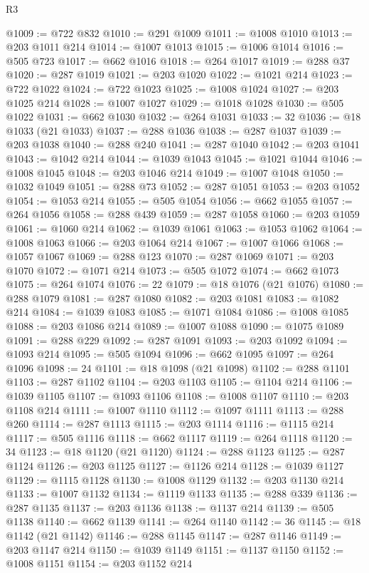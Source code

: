 \begin{lexlean}{R3}
\begin{coremodule}
@1009 := @722 @832
@1010 := @291 @1009
@1011 := @1008 @1010
@1013 := @203 @1011 @214
@1014 := @1007 @1013
@1015 := @1006 @1014
@1016 := @505 @723
@1017 := @662 @1016
@1018 := @264 @1017
@1019 := @288 @37
@1020 := @287 @1019
@1021 := @203 @1020
@1022 := @1021 @214
@1023 := @722 @1022
@1024 := @722 @1023
@1025 := @1008 @1024
@1027 := @203 @1025 @214
@1028 := @1007 @1027
@1029 := @1018 @1028
@1030 := @505 @1022
@1031 := @662 @1030
@1032 := @264 @1031
@1033 := 32
@1036 := @18 @1033 (@21 @1033)
@1037 := @288 @1036
@1038 := @287 @1037
@1039 := @203 @1038
@1040 := @288 @240
@1041 := @287 @1040
@1042 := @203 @1041
@1043 := @1042 @214
@1044 := @1039 @1043
@1045 := @1021 @1044
@1046 := @1008 @1045
@1048 := @203 @1046 @214
@1049 := @1007 @1048
@1050 := @1032 @1049
@1051 := @288 @73
@1052 := @287 @1051
@1053 := @203 @1052
@1054 := @1053 @214
@1055 := @505 @1054
@1056 := @662 @1055
@1057 := @264 @1056
@1058 := @288 @439
@1059 := @287 @1058
@1060 := @203 @1059
@1061 := @1060 @214
@1062 := @1039 @1061
@1063 := @1053 @1062
@1064 := @1008 @1063
@1066 := @203 @1064 @214
@1067 := @1007 @1066
@1068 := @1057 @1067
@1069 := @288 @123
@1070 := @287 @1069
@1071 := @203 @1070
@1072 := @1071 @214
@1073 := @505 @1072
@1074 := @662 @1073
@1075 := @264 @1074
@1076 := 22
@1079 := @18 @1076 (@21 @1076)
@1080 := @288 @1079
@1081 := @287 @1080
@1082 := @203 @1081
@1083 := @1082 @214
@1084 := @1039 @1083
@1085 := @1071 @1084
@1086 := @1008 @1085
@1088 := @203 @1086 @214
@1089 := @1007 @1088
@1090 := @1075 @1089
@1091 := @288 @229
@1092 := @287 @1091
@1093 := @203 @1092
@1094 := @1093 @214
@1095 := @505 @1094
@1096 := @662 @1095
@1097 := @264 @1096
@1098 := 24
@1101 := @18 @1098 (@21 @1098)
@1102 := @288 @1101
@1103 := @287 @1102
@1104 := @203 @1103
@1105 := @1104 @214
@1106 := @1039 @1105
@1107 := @1093 @1106
@1108 := @1008 @1107
@1110 := @203 @1108 @214
@1111 := @1007 @1110
@1112 := @1097 @1111
@1113 := @288 @260
@1114 := @287 @1113
@1115 := @203 @1114
@1116 := @1115 @214
@1117 := @505 @1116
@1118 := @662 @1117
@1119 := @264 @1118
@1120 := 34
@1123 := @18 @1120 (@21 @1120)
@1124 := @288 @1123
@1125 := @287 @1124
@1126 := @203 @1125
@1127 := @1126 @214
@1128 := @1039 @1127
@1129 := @1115 @1128
@1130 := @1008 @1129
@1132 := @203 @1130 @214
@1133 := @1007 @1132
@1134 := @1119 @1133
@1135 := @288 @339
@1136 := @287 @1135
@1137 := @203 @1136
@1138 := @1137 @214
@1139 := @505 @1138
@1140 := @662 @1139
@1141 := @264 @1140
@1142 := 36
@1145 := @18 @1142 (@21 @1142)
@1146 := @288 @1145
@1147 := @287 @1146
@1149 := @203 @1147 @214
@1150 := @1039 @1149
@1151 := @1137 @1150
@1152 := @1008 @1151
@1154 := @203 @1152 @214

\end{coremodule}
\end{lexlean}
